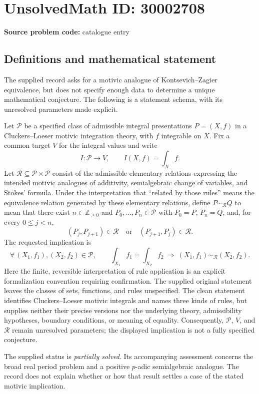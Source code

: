 \documentclass[11pt]{article}
\newcommand{\Z}{\mathbb{Z}}
\begin{document}
\section*{UnsolvedMath ID: 30002708}
\textbf{Source problem code:} catalogue entry
\subsection{Definitions and mathematical statement}
The supplied record asks for a motivic analogue of Kontsevich--Zagier equivalence, but does not specify enough data to determine a unique mathematical conjecture. The following is a statement schema, with its unresolved parameters made explicit.

Let \(\mathcal P\) be a specified class of admissible integral presentations \(P=(X,f)\) in a Cluckers--Loeser motivic integration theory, with \(f\) integrable on \(X\). Fix a common target \(V\) for the integral values and write
\[
I\colon\mathcal P\longrightarrow V,\qquad I(X,f)=\int_X f.
\]
Let \(\mathcal R\subseteq\mathcal P\times\mathcal P\) consist of the admissible elementary relations expressing the intended motivic analogues of additivity, semialgebraic change of variables, and Stokes' formula. Under the interpretation that ``related by those rules'' means the equivalence relation generated by these elementary relations, define \(P\sim_{\mathcal R}Q\) to mean that there exist \(n\in\Z_{\geq 0}\) and \(P_0,\ldots,P_n\in\mathcal P\) with \(P_0=P\), \(P_n=Q\), and, for every \(0\leq j<n\),
\[
(P_j,P_{j+1})\in\mathcal R
\quad\text{or}\quad
(P_{j+1},P_j)\in\mathcal R.
\]
The requested implication is
\[
\forall\,(X_1,f_1),(X_2,f_2)\in\mathcal P,\qquad
\int_{X_1}f_1=\int_{X_2}f_2
\ \Longrightarrow\
(X_1,f_1)\sim_{\mathcal R}(X_2,f_2).
\]
Here the finite, reversible interpretation of rule application is an explicit formalization convention requiring confirmation. The supplied original statement leaves the classes of sets, functions, and rules unspecified. The clean statement identifies Cluckers--Loeser motivic integrals and names three kinds of rules, but supplies neither their precise versions nor the underlying theory, admissibility hypotheses, boundary conditions, or meaning of equality. Consequently, \(\mathcal P\), \(V\), and \(\mathcal R\) remain unresolved parameters; the displayed implication is not a fully specified conjecture.

The supplied status is \emph{partially solved}. Its accompanying assessment concerns the broad real period problem and a positive \(p\)-adic semialgebraic analogue. The record does not explain whether or how that result settles a case of the stated motivic implication.
\end{document}
